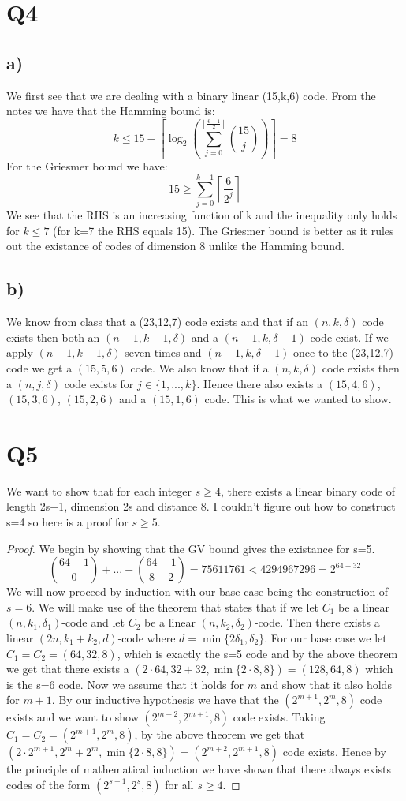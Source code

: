 \documentclass{article}
\begin{document}
\section*{Q4}
\subsection*{a)}
We first see that we are dealing with a binary linear (15,k,6) code. From the notes we have that the Hamming bound is:
$$k\leq 15-\left\lceil\log_2\left(\sum_{j=0}^{\left\lfloor\frac{6-1}{2}\right\rfloor}{15\choose j}\right)\right\rceil=8$$
For the Griesmer bound we have:
$$15\geq \sum_{j=0}^{k-1}\left\lceil\frac{6}{2^j}\right\rceil$$
We see that the RHS is an increasing function of k and the inequality only holds for $k\leq7$ (for k=7 the RHS equals 15). The Griesmer bound is better as it rules out the existance of codes of dimension 8 unlike the Hamming bound.
\subsection*{b)}
We know from class that a (23,12,7) code exists and that if an $(n,k,\delta)$ code exists then both an $(n-1,k-1,\delta)$ and a $(n-1,k,\delta-1)$ code exist. If we apply $(n-1,k-1,\delta)$ seven times and $(n-1,k,\delta-1)$ once to the (23,12,7) code we get a $(15,5,6)$ code. We also know that if a $(n,k,\delta)$ code exists then a $(n,j,\delta)$ code exists for $j\in\{1,...,k\}$. Hence there also exists a $(15,4,6)$, $(15,3,6)$, $(15,2,6)$ and a $(15,1,6)$ code. This is what we wanted to show.
\section*{Q5}
We want to show that for each integer $s\geq4$, there exists a linear binary code of length 2s+1, dimension 2s and distance 8. I couldn't figure out how to construct s=4 so here is a proof for $s\geq5$.
\begin{proof}
We begin by showing that the GV bound gives the existance for s=5.
$${64-1\choose0}+...+{64-1\choose8-2}=75611761<4294967296=2^{64-32}$$
We will now proceed by induction with our base case being the construction of $s=6$. We will make use of the theorem that states that if we let $C_1$ be a linear $(n, k_1, \delta_1)$-code and let $C_2$ be a linear $(n, k_2, \delta_2)$-code. Then there exists a linear $(2n, k_1 + k_2, d)$-code where $d = \min\{2\delta_1, \delta_2\}$. For our base case we let $C_1=C_2=(64,32,8)$, which is exactly the s=5 code and by the above theorem we get that there exists a $(2\cdot64,32+32,\min\{2\cdot8, 8\})=(128,64,8)$ which is the s=6 code. Now we assume that it holds for $m$ and show that it also holds for $m+1$. By our inductive hypothesis we have that the $(2^{m+1},2^m,8)$ code exists and we want to show $(2^{m+2},2^{m+1},8)$ code exists. Taking $C_1=C_2=(2^{m+1},2^m,8)$, by the above theorem we get that $(2\cdot2^{m+1},2^{m}+2^{m},\min\{2\cdot8, 8\})=(2^{m+2},2^{m+1},8)$ code exists. Hence by the principle of mathematical induction we have shown that there always exists codes of the form $(2^{s+1},2^s,8)$ for all $s\geq4$. 
\end{proof}
\end{document}
